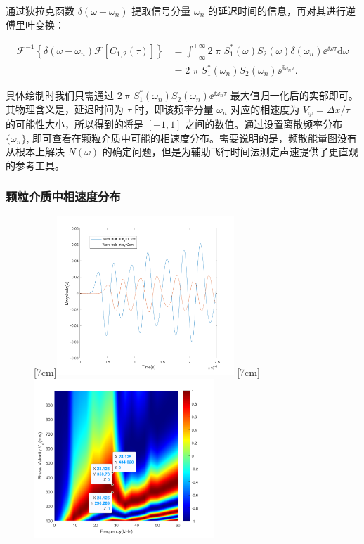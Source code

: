 通过狄拉克函数 $\delta(\omega-\omega_{n})$ 提取信号分量 $\omega_{n}$ 的延迟时间的信息，再对其进行逆傅里叶变换：

\begin{align}
  \mathcal{F}^{-1}\left\{\delta(\omega-\omega_{n})\mathcal{F}[C_{1,2}(\tau)]\right\} &= \int_{-\infty}^{+\infty}2\uppi S_{1}^{*}(\omega)S_{2}(\omega)\delta(\omega_{n}){\ee}^{\ii\omega\tau}\mathrm{d}\omega \nonumber \\
  &= 2\uppi S_{1}^{*}(\omega_{n})S_{2}(\omega_{n}){\ee}^{\ii\omega_{n}\tau}.
\end{align}

具体绘制时我们只需通过 $2\uppi S_{1}^{*}(\omega_{n})S_{2}(\omega_{n}){\ee}^{\ii\omega_{n}\tau}$ 最大值归一化后的实部即可。其物理含义是，延迟时间为 $\tau$ 时，即该频率分量 $\omega_{n}$ 对应的相速度为 $V_{\varphi} = \Delta x/\tau$ 的可能性大小，所以得到的将是 $[-1,1]$ 之间的数值。通过设置离散频率分布 $\{\omega_{n}\}$, 即可查看在颗粒介质中可能的相速度分布。需要说明的是，频散能量图没有从根本上解决 $N(\omega)$ 的确定问题，但是为辅助飞行时间法测定声速提供了更直观的参考工具。

\subsubsection{颗粒介质中相速度分布}


\begin{figure}[!hbtp]
  \centering
                [7cm]{\includegraphics[height=6cm]{figures/2_wave_train.png}}
  \hspace{1cm}
                [7cm]{\includegraphics[height=6cm]{figures/2_cwt_v_phi.png}}
  \label{fig:dispersion_energy}
\end{figure}


